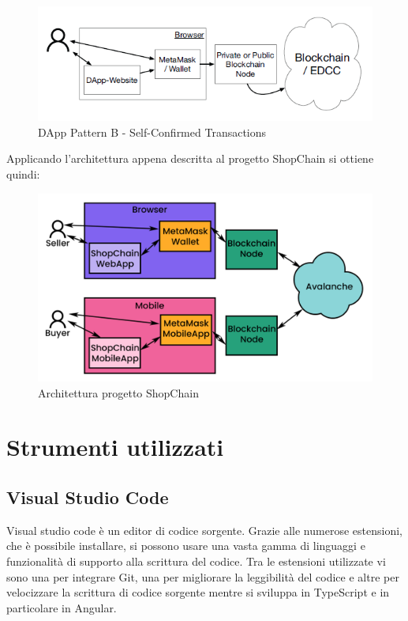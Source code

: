 \begin{figure}[!h] 
    \centering 
    \includegraphics[width=0.9\columnwidth]{immagini/ArchitetturaDApp.png}
    \caption{DApp Pattern B - Self-Confirmed Transactions}
\end{figure}

Applicando l'architettura appena descritta al progetto ShopChain si ottiene quindi:

\begin{figure}[!h] 
    \centering 
    \includegraphics[width=0.9\columnwidth]{immagini/architettura.png}
    \caption{Architettura progetto ShopChain}
\end{figure}

\section{Strumenti utilizzati}
\subsection*{Visual Studio Code}
Visual studio code è un editor di codice sorgente. Grazie alle numerose estensioni, che è possibile installare, si possono usare una vasta gamma di linguaggi e funzionalità di supporto alla scrittura del codice. Tra le estensioni utilizzate vi sono una per integrare Git, una per migliorare la leggibilità del codice e altre per velocizzare la scrittura di codice sorgente mentre si sviluppa in TypeScript e in particolare in Angular.


